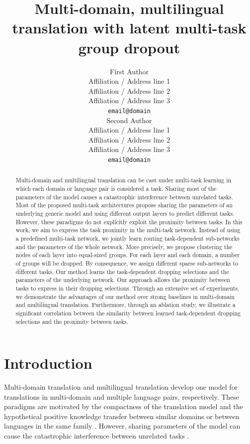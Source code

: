 \documentclass[11pt]{article}
\title{Multi-domain, multilingual translation with latent multi-task group dropout}
\author{First Author \\
  Affiliation / Address line 1 \\
  Affiliation / Address line 2 \\
  Affiliation / Address line 3 \\
  \texttt{email@domain} \\\And
  Second Author \\
  Affiliation / Address line 1 \\
  Affiliation / Address line 2 \\
  Affiliation / Address line 3 \\
  \texttt{email@domain} \\}
\begin{document}
\setlength{\abovedisplayskip}{3pt}
\setlength{\belowdisplayskip}{3pt}
\maketitle
\begin{abstract}
Multi-domain and multilingual translation can be cast under multi-task learning in which each domain or language pair is considered a task. Sharing most of the parameters of the model causes a catastrophic interference between unrelated tasks. Most of the proposed multi-task architectures propose sharing the parameters of an underlying generic model and using different output layers to predict different tasks. However, these paradigms do not explicitly exploit the proximity between tasks. In this work, we aim to express the task proximity in the multi-task network. Instead of using a predefined multi-task network, we jointly learn routing task-dependent sub-networks and the parameters of the whole network. More precisely, we propose clustering the nodes of each layer into equal-sized groups. For each layer and each domain, a number of groups will be dropped. By consequence, we assign different sparse sub-networks to different tasks. Our method learns the task-dependent dropping selections and the parameters of the underlying network. Our approach allows the proximity between tasks to express in their dropping selections. Through an extensive set of experiments, we demonstrate the advantages of our method over strong baselines in multi-domain and multilingual translation. Furthermore, through an ablation study, we illustrate a significant correlation between the similarity between learned task-dependent dropping selections and the proximity between tasks.
\end{abstract}

\section{Introduction}
Multi-domain translation and multilingual translation develop one model for translations in multi-domain and multiple language pairs, respectively. These paradigms are motivated by the compactness of the translation model \cite{dabre20survey,Chu18multilingual} and the hypothetical positive knowledge transfer between similar domains \citep{Pham21revisiting} or between languages in the same family \citep{Tan19multilingual}. However, sharing parameters of the model can cause the catastrophic interference between unrelated tasks \citep{conneau20unsupervised,wang20negative}.
\end{document}
